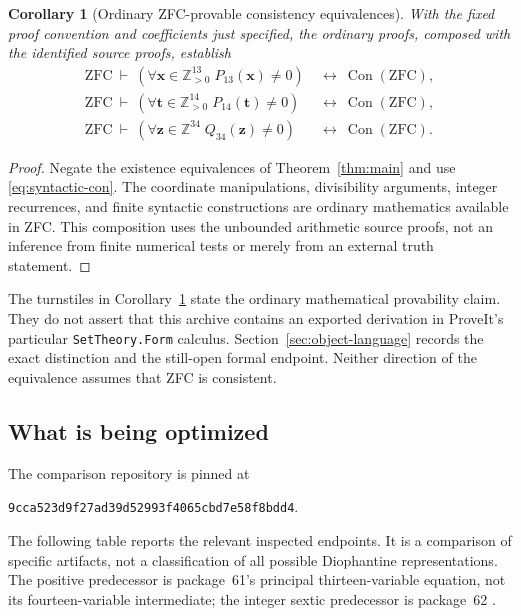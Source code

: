 \documentclass[11pt,a4paper]{article}
\newtheorem{corollary}[theorem]{Corollary}
\theoremstyle{definition}
\newcommand{\Z}{\mathbb Z}
\newcommand{\Zpos}{\mathbb Z_{>0}}
\newcommand{\ZFC}{\mathrm{ZFC}}
\newcommand{\Con}{\operatorname{Con}}
\newcommand{\snapshot}{\texttt{9cca523d9f27ad39d52993f4065cbd7e58f8bdd4}}
\begin{document}
\begin{corollary}[Ordinary ZFC-provable consistency equivalences]
\label{cor:zfc}
With the fixed proof convention and coefficients just specified, the
ordinary proofs, composed with the identified source proofs, establish
\begin{align}
 \ZFC\ \vdash\
 \left(\forall\mathbf x\in\Zpos^{13}\;
      P_{13}(\mathbf x)\ne0\right)
 &\ \longleftrightarrow\ \Con(\ZFC),
 \label{eq:zfc-pos}\\
 \ZFC\ \vdash\
 \left(\forall\mathbf t\in\Zpos^{14}\;
      P_{14}(\mathbf t)\ne0\right)
 &\ \longleftrightarrow\ \Con(\ZFC),
 \label{eq:zfc-pos14}\\
 \ZFC\ \vdash\
 \left(\forall\mathbf z\in\Z^{34}\;
      Q_{34}(\mathbf z)\ne0\right)
 &\ \longleftrightarrow\ \Con(\ZFC).
 \label{eq:zfc-int}
\end{align}
\end{corollary}

\begin{proof}
Negate the existence equivalences of Theorem~\ref{thm:main} and use
\eqref{eq:syntactic-con}.  The coordinate manipulations, divisibility
arguments, integer recurrences, and finite syntactic constructions are
ordinary mathematics available in ZFC.  This composition uses the
unbounded arithmetic source proofs, not an inference from finite
numerical tests or merely from an external truth statement.
\end{proof}

The turnstiles in Corollary~\ref{cor:zfc} state the ordinary mathematical
provability claim.  They do not assert that this archive contains an
exported derivation in ProveIt's particular \texttt{SetTheory.Form}
calculus.  Section~\ref{sec:object-language} records the exact distinction
and the still-open formal endpoint.  Neither direction of the
equivalence assumes that ZFC is consistent.

\subsection{What is being optimized}

The comparison repository is pinned at
\begin{center}
 \snapshot.
\end{center}
The following table reports the relevant inspected endpoints.  It is a
comparison of specific artifacts, not a classification of all possible
Diophantine representations.  The positive predecessor is package~61's
principal thirteen-variable equation, not its fourteen-variable
intermediate; the integer sextic predecessor is package~62
\cite{source61,source62}.
\end{document}
